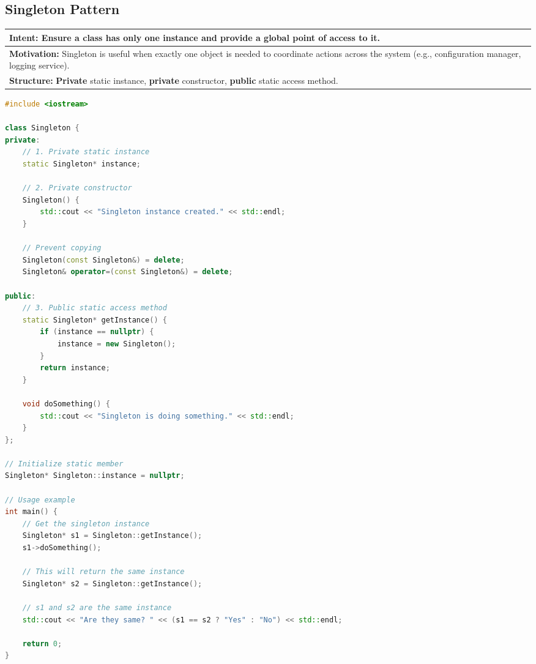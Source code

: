 \documentclass[12pt,a4paper]{article}
\begin{document}
\subsection{Singleton Pattern}
\label{subsec:singleton}

\begin{tabular}{p{}}
    \hline
    \rowcolor{lightgray}
    \textbf{Intent:} Ensure a class has only one instance and provide a global point of access to it. \\
    \hline
    \textbf{Motivation:} Singleton is useful when exactly one object is needed to coordinate actions across the system (e.g., configuration manager, logging service). \\
    \hline
    \textbf{Structure:} \textbf{Private} static instance, \textbf{private} constructor, \textbf{public} static access method. \\
    \hline
\end{tabular}

\vspace{1em}

\begin{lstlisting}[language=C++, caption={Singleton Pattern Implementation in C++}, label=lst:singleton]
#include <iostream>

class Singleton {
private:
    // 1. Private static instance
    static Singleton* instance;
    
    // 2. Private constructor
    Singleton() {
        std::cout << "Singleton instance created." << std::endl;
    }
    
    // Prevent copying
    Singleton(const Singleton&) = delete;
    Singleton& operator=(const Singleton&) = delete;

public:
    // 3. Public static access method
    static Singleton* getInstance() {
        if (instance == nullptr) {
            instance = new Singleton();
        }
        return instance;
    }
    
    void doSomething() {
        std::cout << "Singleton is doing something." << std::endl;
    }
};

// Initialize static member
Singleton* Singleton::instance = nullptr;

// Usage example
int main() {
    // Get the singleton instance
    Singleton* s1 = Singleton::getInstance();
    s1->doSomething();
    
    // This will return the same instance
    Singleton* s2 = Singleton::getInstance();
    
    // s1 and s2 are the same instance
    std::cout << "Are they same? " << (s1 == s2 ? "Yes" : "No") << std::endl;
    
    return 0;
}
\end{lstlisting}
\end{document}
